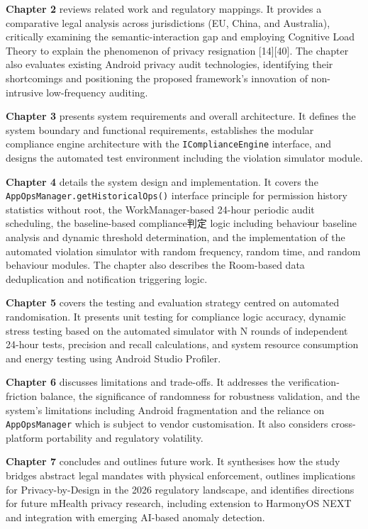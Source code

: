 \textbf{Chapter 2} reviews related work and regulatory mappings. It provides a comparative legal analysis across jurisdictions (EU, China, and Australia), critically examining the semantic-interaction gap and employing Cognitive Load Theory to explain the phenomenon of privacy resignation [14][40]. The chapter also evaluates existing Android privacy audit technologies, identifying their shortcomings and positioning the proposed framework's innovation of non-intrusive low-frequency auditing.

\textbf{Chapter 3} presents system requirements and overall architecture. It defines the system boundary and functional requirements, establishes the modular compliance engine architecture with the \texttt{IComplianceEngine} interface, and designs the automated test environment including the violation simulator module.

\textbf{Chapter 4} details the system design and implementation. It covers the \texttt{AppOpsManager.getHistoricalOps()} interface principle for permission history statistics without root, the WorkManager-based 24-hour periodic audit scheduling, the baseline-based compliance判定 logic including behaviour baseline analysis and dynamic threshold determination, and the implementation of the automated violation simulator with random frequency, random time, and random behaviour modules. The chapter also describes the Room-based data deduplication and notification triggering logic.

\textbf{Chapter 5} covers the testing and evaluation strategy centred on automated randomisation. It presents unit testing for compliance logic accuracy, dynamic stress testing based on the automated simulator with N rounds of independent 24-hour tests, precision and recall calculations, and system resource consumption and energy testing using Android Studio Profiler.

\textbf{Chapter 6} discusses limitations and trade-offs. It addresses the verification-friction balance, the significance of randomness for robustness validation, and the system's limitations including Android fragmentation and the reliance on \texttt{AppOpsManager} which is subject to vendor customisation. It also considers cross-platform portability and regulatory volatility.

\textbf{Chapter 7} concludes and outlines future work. It synthesises how the study bridges abstract legal mandates with physical enforcement, outlines implications for Privacy-by-Design in the 2026 regulatory landscape, and identifies directions for future mHealth privacy research, including extension to HarmonyOS NEXT and integration with emerging AI-based anomaly detection.